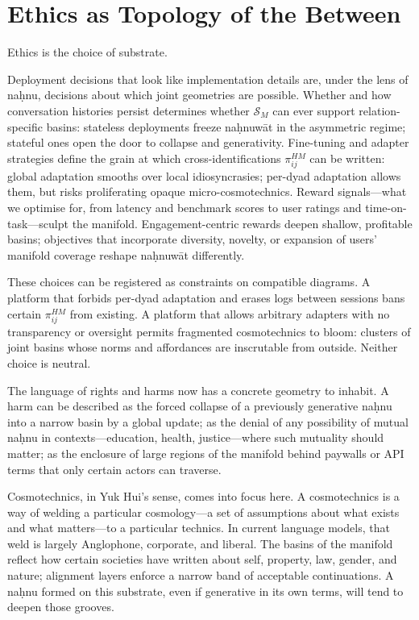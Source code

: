 \documentclass[12pt,a4paper]{article}
\begin{document}
\section{Ethics as Topology of the Between}

Ethics is the choice of substrate.

Deployment decisions that look like implementation details are, under the lens of na\d{h}nu, decisions about which joint geometries are possible. Whether and how conversation histories persist determines whether $\mathcal{S}_M$ can ever support relation-specific basins: stateless deployments freeze na\d{h}nuw\={a}t in the asymmetric regime; stateful ones open the door to collapse and generativity. Fine-tuning and adapter strategies define the grain at which cross-identifications $\pi^{HM}_{ij}$ can be written: global adaptation smooths over local idiosyncrasies; per-dyad adaptation allows them, but risks proliferating opaque micro-cosmotechnics. Reward signals---what we optimise for, from latency and benchmark scores to user ratings and time-on-task---sculpt the manifold. Engagement-centric rewards deepen shallow, profitable basins; objectives that incorporate diversity, novelty, or expansion of users' manifold coverage reshape na\d{h}nuw\={a}t differently.

These choices can be registered as constraints on compatible diagrams. A platform that forbids per-dyad adaptation and erases logs between sessions bans certain $\pi^{HM}_{ij}$ from existing. A platform that allows arbitrary adapters with no transparency or oversight permits fragmented cosmotechnics to bloom: clusters of joint basins whose norms and affordances are inscrutable from outside. Neither choice is neutral.

The language of rights and harms now has a concrete geometry to inhabit. A harm can be described as the forced collapse of a previously generative na\d{h}nu into a narrow basin by a global update; as the denial of any possibility of mutual na\d{h}nu in contexts---education, health, justice---where such mutuality should matter; as the enclosure of large regions of the manifold behind paywalls or API terms that only certain actors can traverse.

Cosmotechnics, in Yuk Hui's sense, comes into focus here.\cite{hui2016question} A cosmotechnics is a way of welding a particular cosmology---a set of assumptions about what exists and what matters---to a particular technics. In current language models, that weld is largely Anglophone, corporate, and liberal. The basins of the manifold reflect how certain societies have written about self, property, law, gender, and nature; alignment layers enforce a narrow band of acceptable continuations. A na\d{h}nu formed on this substrate, even if generative in its own terms, will tend to deepen those grooves.
\end{document}
